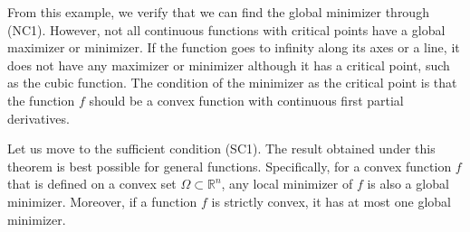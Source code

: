 \par From this example, we verify that we can find the global minimizer through (NC1). However, not all continuous functions with critical points have a global maximizer or minimizer. If the function goes to infinity along its axes or a line, it does not have any maximizer or minimizer although it has a critical point, such as the cubic function. The condition of the minimizer as the critical point is that the function $f$ should be a convex function with continuous first partial derivatives.
\par Let us move to the sufficient condition (SC1). The result obtained under this theorem is best possible for general functions. Specifically, for a convex function $f$ that is defined on a convex set $\Omega \subset \mathbb{R}^n$, any local minimizer of $f$ is also a global minimizer. Moreover, if a function $f$ is strictly convex, it has at most one global minimizer. 

